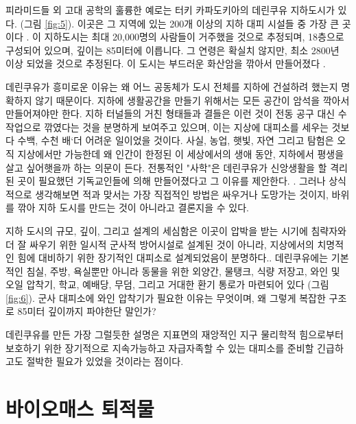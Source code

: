 \documentclass[10pt,twocolumn,letterpaper]{article}
\begin{document}
피라미드들 외 고대 공학의 훌륭한 예로는 터키 카파도키아의 데린쿠유 지하도시가 있다. (그림 \ref{fig:5}). 이곳은 그 지역에 있는 200개 이상의 지하 대피 시설들 중 가장 큰 곳이다 \cite{54}. 이 지하도시는 최대 20,000명의 사람들이 거주했을 것으로 추정되며, 18층으로 구성되어 있으며, 깊이는 85미터에 이릅니다. 그 연령은 확실치 않지만, 최소 2800년 이상 되었을 것으로 추정된다. 이 도시는 부드러운 화산암을 깎아서 만들어졌다 \cite{52, 53}.

데린쿠유가 흥미로운 이유는 왜 어느 공동체가 도시 전체를 지하에 건설하려 했는지 명확하지 않기 때문이다. 지하에 생활공간을 만들기 위해서는 모든 공간이 암석을 깍아서 만들어져야만 한다. 지하 터널들의 거친 형태들과 결들은 이런 것이 전동 공구 대신 수작업으로 깎였다는 것을 분명하게 보여주고 있으며, 이는 지상에 대피소를 세우는 것보다 수백, 수천 배`더 어려운 일이었을 것이다. 사실, 농업, 햇빛, 자연 그리고 탐험은 오직 지상에서만  가능한데 왜 인간이 한정된 이 세상에서의 생애 동안, 지하에서 평생을 살고 싶어햇을까 하는 의문이 든다. 전통적인 "사학"은 데린쿠유가 신앙생활을 할 격리된 곳이 필요했던 기독교인들에 의해 만들어졌다고 그 이유를 제안한다. \cite{53}. 그러나 상식적으로 생각해보면 적과 맞서는 가장 직접적인 방법은  싸우거나 도망가는 것이지, 바위를 깎아 지하 도시를 만드는 것이 아니라고 결론지을 수 있다.

지하 도시의 규모, 깊이, 그리고 설계의 세심함은 이곳이 압박을 받는 시기에
 침략자와 더 잘 싸우기 위한 일시적 군사적 방어시설로 설계된 것이 아니라, 지상에서의 치명적인 힘에 대비하기 위한 장기적인 대피소로 설계되었음이 분명하다.. 데린쿠유에는 기본적인 침실, 주방, 욕실뿐만 아니라 동물을 위한 외양간, 물탱크, 식량 저장고, 와인 및 오일 압착기, 학교, 예배당, 무덤, 그리고 거대한 환기 통로가 마련되어 있다 (그림 \ref{fig:6}). 군사 대피소에 와인 압착기가 필요한 이유는 무엇이며, 왜 그렇게 복잡한 구조로 85미터 깊이까지 파야한단 말인가?

데린쿠유를 만든 가장 그럴듯한 설명은 지표면의 재앙적인 지구 물리학적 힘으로부터 보호하기 위한 장기적으로 지속가능하고 자급자족할 수 있는 대피소를 준비할 긴급하고도 절박한 필요가 있었을 것이라는 점이다.

\section{바이오매스 퇴적물}
\end{document}
